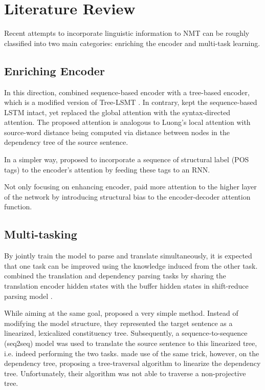 \chapter{Literature Review}

Recent attempts to incorporate linguistic information to NMT can be roughly classified into two main categories: enriching the encoder and multi-task learning.

\section{Enriching Encoder}
In this direction, \cite{DBLP:conf/acl/EriguchiHT16} combined sequence-based encoder with a tree-based encoder, which is a modified version of Tree-LSMT \citep{DBLP:conf/acl/TaiSM15}. In contrary, \cite{DBLP:journals/corr/abs-1711-04231} kept the sequence-based LSTM intact, yet replaced the global attention \citep{DBLP:conf/emnlp/LuongPM15} with the syntax-directed attention. The proposed attention is analogous to Luong's local attention with source-word distance being computed via distance between nodes in the dependency tree of the source sentence.

In a simpler way, \cite{DBLP:conf/acl/LiXTZZZ17} proposed to incorporate a sequence of structural label (POS tags) to the encoder's attention by feeding these tags to an RNN.

Not only focusing on enhancing encoder, \cite{DBLP:conf/naacl/CohnHVYDH16} paid more attention to the higher layer of the network by introducing structural bias to the encoder-decoder attention function.

\section{Multi-tasking}
By jointly train the model to parse and translate simultaneously, it is expected that one task can be improved using the knowledge induced from the other task. \citet{DBLP:conf/acl/EriguchiTC17} combined the translation and dependency parsing tasks by sharing the translation encoder hidden states with the buffer hidden states in shift-reduce parsing model \cite{DBLP:conf/naacl/DyerKBS16}.

While aiming at the same goal, \citet{DBLP:conf/acl/AharoniG17a} proposed a very simple method. Instead of modifying the model structure, they represented the target sentence as a linearized, lexicalized constituency tree. Subsequently, a sequence-to-sequence (seq2seq) model \cite{DBLP:conf/nips/SutskeverVL14} was used to translate the source sentence to this linearized tree, i.e. indeed performing the two tasks. \citet{DBLP:conf/ijcnlp/LeMYM17} made use of the same trick, however, on the dependency tree, proposing a tree-traversal algorithm to linearize the dependency tree. Unfortunately, their algorithm was not able to traverse a non-projective tree.

